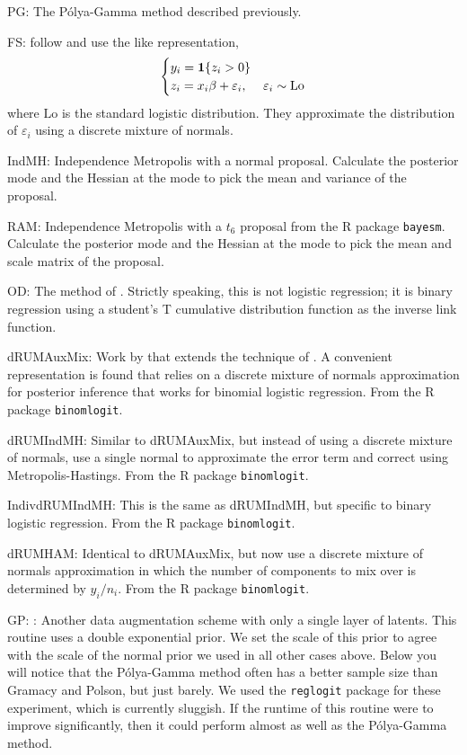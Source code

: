 \documentclass[11pt]{article}
\newcommand{\one}{\bold{1}}
\newcommand{\ep}{\varepsilon}
\newcommand{\Polya}{P\'{o}lya}
\begin{document}
\begin{outline}

\1 PG: The \Polya-Gamma method described previously.

\1 FS: \cite{fruhwirth-schnatter-fruhwirth-2010} follow \cite{holmes-held-2006}
and use the \cite{albert-chib-1993} like representation,
\begin{equation}
\label{eqn:hh-rep}
\begin{cases}
y_i = \one \{ z_i > 0 \} \\
z_i = x_i \beta + \ep_i, & \ep_i \sim \text{Lo}
\end{cases}
\end{equation}
where $\text{Lo}$ is the standard logistic distribution.  They approximate the
distribution of $\ep_i$ using a discrete mixture of normals.

\1 IndMH: Independence Metropolis with a normal proposal.  Calculate the
posterior mode and the Hessian at the mode to pick the mean and variance of the
proposal.

\1 RAM: Independence Metropolis with a $t_6$ proposal from the R package
\texttt{bayesm}.  Calculate the posterior mode and the Hessian at the mode to
pick the mean and scale matrix of the proposal.

\1 OD: The method of \cite{obrien-dunson-2004}.  Strictly speaking, this is not
logistic regression; it is binary regression using a student's T cumulative
distribution function as the inverse link function.

\1 dRUMAuxMix: Work by \cite{fussl-etal-2013} that extends the technique of
\cite{fruhwirth-schnatter-fruhwirth-2010}.  A convenient representation is found
that relies on a discrete mixture of normals approximation for posterior
inference that works for binomial logistic regression.  From the R package
\texttt{binomlogit}.

\1 dRUMIndMH: Similar to dRUMAuxMix, but instead of using a discrete mixture of
normals, use a single normal to approximate the error term and correct using
Metropolis-Hastings.  From the R package \texttt{binomlogit}.

\1 IndivdRUMIndMH: This is the same as dRUMIndMH, but specific to binary
logistic regression.  From the R package \texttt{binomlogit}.

\1 dRUMHAM: Identical to dRUMAuxMix, but now use a discrete mixture of normals
approximation in which the number of components to mix over is determined by
$y_i / n_i$.  From the R package \texttt{binomlogit}.

\1 GP: \cite{gramacy-polson-2012}: Another data augmentation scheme with only a
single layer of latents.  This routine uses a double exponential prior.  We set
the scale of this prior to agree with the scale of the normal prior we used in
all other cases above.  Below you will notice that the \Polya-Gamma method often
has a better sample size than Gramacy and Polson, but just barely.  We used the
\texttt{reglogit} package for these experiment, which is currently sluggish.  If
the runtime of this routine were to improve significantly, then it could perform
almost as well as the \Polya-Gamma method.

\end{outline}
\end{document}

